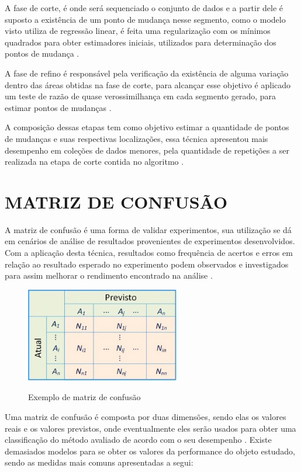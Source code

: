 A fase de corte, é onde será sequenciado o conjunto de dados e a partir dele é suposto a existência de um ponto de mudança nesse segmento, como o modelo visto utiliza de regressão linear, é feita uma regularização com os mínimos quadrados para obter estimadores iniciais, utilizados para determinação dos pontos de mudança \cite{Jin2016}.

A fase de refino é responsável pela verificação da existência de alguma variação dentro das áreas obtidas na fase de corte, para alcançar esse objetivo é aplicado um teste de razão de quase verossimilhança em cada segmento gerado, para estimar pontos de mudanças \cite{Jin2016}.

A composição dessas etapas tem como objetivo estimar a quantidade de pontos de mudanças e suas respectivas localizações, essa técnica apresentou mais desempenho em coleções de dados menores, pela quantidade de repetições a ser realizada na etapa de corte contida no algoritmo \cite{Jin2016}.

\section{MATRIZ DE CONFUSÃO}
\label{sec:matrizDeConfusao}

A matriz de confusão é uma forma de validar experimentos, sua utilização se dá em cenários de análise de resultados provenientes de experimentos desenvolvidos. Com a aplicação desta técnica, resultados como frequência de acertos e erros em relação ao resultado esperado no experimento podem observados e investigados para assim melhorar o rendimento encontrado na análise \cite{Ruuska2018}.

\begin{figure}[!htb]
    \centering
    \caption{Exemplo de matriz de confusão}
    \includegraphics[width=0.6\textwidth]{./dados/figuras/matriz-de-confusao}
    \label{fig:matriz-confusao}
\end{figure}

Uma matriz de confusão é composta por duas dimensões, sendo elas os valores reais e os valores previstos, onde eventualmente eles serão usados para obter uma classificação do método avaliado de acordo com o seu desempenho \cite{Deng2016}. Existe demasiados modelos para se obter os valores da performance do objeto estudado, sendo as medidas mais comuns apresentadas a segui:


